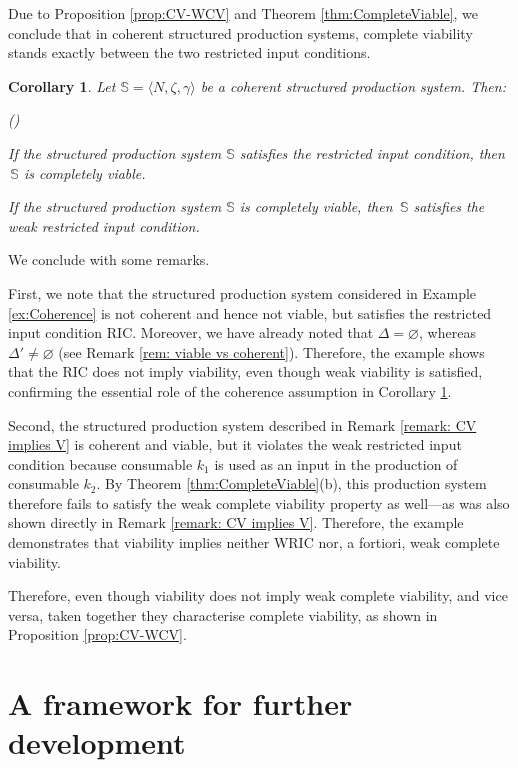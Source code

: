 \documentclass[11pt,fleqn]{article}
\newcounter{llst}
\newenvironment{abet}{\begin{list}{\rm (\alph{llst})}{\usecounter{llst}
		\setlength{\itemindent}{0em} \setlength{\leftmargin}{3em}
		\setlength{\labelwidth}{2em} \setlength{\labelsep}{1em}}}{\end{list}}
\newtheorem{corollary}[theorem]{Corollary}
\begin{document}
\noindent 
Due to Proposition \ref{prop:CV-WCV} and Theorem \ref{thm:CompleteViable}, we conclude that in coherent structured production systems, complete viability stands exactly between the two restricted input conditions. 

\begin{corollary}\label{cor: completeviable and RIC}
	Let $\mathbb S = \langle N, \zeta , \gamma \rangle$ be a coherent structured production system. Then:
	\begin{abet}
		\item If the structured production system $\mathbb S$ satisfies the restricted input condition, then $\, \mathbb S$ is completely viable.
		\item If the structured production system $\mathbb S$ is  completely viable, then $\, \mathbb S$ satisfies the weak restricted input condition.
	\end{abet}
\end{corollary}

\noindent
We conclude with some remarks. 

First, we note that the structured production system considered in Example \ref{ex:Coherence} is not coherent and hence not viable, but satisfies the restricted input condition RIC. Moreover, we have already noted that $\Delta = \varnothing$, whereas $\Delta' \neq \varnothing$ (see Remark \ref{rem: viable vs coherent}). Therefore, the example shows that the RIC does not imply viability, even though weak viability is satisfied, confirming the essential role of the coherence assumption in Corollary \ref{cor: completeviable and RIC}.  

 Second, the structured production system described in Remark \ref{remark: CV implies V}  is coherent and viable, but it violates the weak restricted input condition because consumable $k_1$ is used as an input in the production of consumable $k_2$. By Theorem \ref{thm:CompleteViable}(b), this production system therefore fails to satisfy the weak complete viability property as well---as was also shown directly in Remark \ref{remark: CV implies V}. Therefore, the example demonstrates that viability implies neither WRIC nor, a fortiori, weak complete viability.  

Therefore, even though viability does not imply weak complete viability, and vice versa, taken together they characterise complete viability, as shown in Proposition \ref{prop:CV-WCV}.


\section{A framework for further development}
\end{document}

